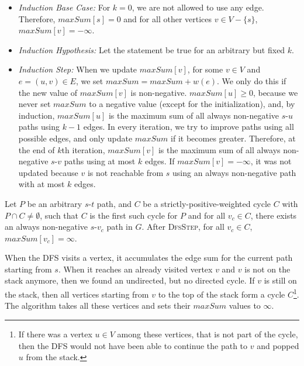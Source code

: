 \documentclass[12pt]{article}
\begin{document}
\begin{itemize}
	\item \emph{Induction Base Case:} For $k=0$, we are not allowed to use any edge. Therefore, $\mathit{maxSum}[s] = 0$ and for all other vertices $v \in V - \{s\}$, $\mathit{maxSum}[v] = -\infty$.
	\item \emph{Induction Hypothesis:} Let the statement be true for an arbitrary but fixed $k$.
	\item \emph{Induction Step:} When we update $\mathit{maxSum}[v]$, for some $v \in V$ and $e=(u,v) \in E$, we set $\mathit{maxSum} = \mathit{maxSum} + w(e)$. We only do this if the new value of $\mathit{maxSum}[v]$ is non-negative. $\mathit{maxSum}[u] \geq 0$, because we never set $\mathit{maxSum}$ to a negative value (except for the initialization), and, by induction, $\mathit{maxSum}[u]$ is the maximum sum of all always non-negative $s$-$u$ paths using $k-1$ edges. In every iteration, we try to improve paths using all possible edges, and only update $\mathit{maxSum}$ if it becomes greater. Therefore, at the end of $k$th iteration, $\mathit{maxSum}[v]$ is the maximum sum of all always non-negative $s$-$v$ paths using at most $k$ edges. If $\mathit{maxSum}[v] = -\infty$, it was not updated because $v$ is not reachable from $s$ using an always non-negative path with at most $k$ edges.
\end{itemize}

\begin{frm-thm}
Let $P$ be an arbitrary $s$-$t$ path, and $C$ be a strictly-positive-weighted cycle $C$ with $P \cap C \not= \emptyset$, such that $C$ is the first such cycle for $P$ and for all $v_c \in C$, there exists an always non-negative $s$-$v_c$ path in $G$. After \textsc{DfsStep}, for all $v_c \in C$, $\mathit{maxSum}[v_c] = \infty$.
\end{frm-thm}

When the DFS visits a vertex, it accumulates the edge sum for the current path starting from $s$. When it reaches an already visited vertex $v$ and $v$ is not on the stack anymore, then we found an undirected, but no directed cycle. If $v$ is still on the stack, then all vertices starting from $v$ to the top of the stack form a cycle $C$\footnote{If there was a vertex $u \in V$ among these vertices, that is not part of the cycle, then the DFS would not have been able to continue the path to $v$ and popped $u$ from the stack.}. The algorithm takes all these vertices and sets their $\mathit{maxSum}$ values to $\infty$.
\end{document}
